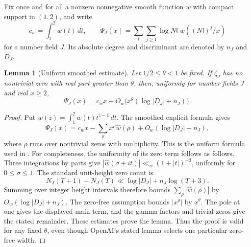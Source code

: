\documentclass[11pt]{article}
\newtheorem{lemma}[theorem]{Lemma}
\theoremstyle{definition}
\theoremstyle{remark}
\begin{document}
Fix once and for all a nonzero nonnegative smooth function $w$
with compact support in $(1,2)$, and write
\[
 c_w=\int_1^2 w(t)\,dt,\qquad
 \Psi_J(x)=\sum_{\mathfrak l}\sum_{j\geq1}
       \log N\mathfrak l\;w((N\mathfrak l)^j/x)
\]
for a number field $J$.  Its absolute degree and discriminant
are denoted by $n_J$ and $D_J$.

\begin{lemma}[Uniform smoothed estimate]\label{lem:smooth}
Let $1/2\leq\theta<1$ be fixed.  If $\zeta_J$ has no
nontrivial zero with real part greater than $\theta$, then,
uniformly for number fields $J$ and real $x\geq2$,
\[
 \Psi_J(x)=c_wx+
 O_w\bigl(x^\theta(\log|D_J|+n_J)\bigr).
\]
\end{lemma}
\begin{proof}
Put $\widehat w(z)=\int_1^2w(t)t^{z-1}\,dt$.
The smoothed explicit formula gives
\[
 \Psi_J(x)=c_wx-\sum_\rho x^\rho\widehat w(\rho)
          +O_w(\log|D_J|+n_J),
\]
where $\rho$ runs over nontrivial zeros with multiplicity.
This is the uniform formula used in
\citet[Lemma~11.2, p.~45]{OpenAI2026}.
For completeness, the uniformity of its zero term follows as follows.
Three integrations by parts give
$|\widehat w(\sigma+it)|\ll_w(1+|t|)^{-3}$,
uniformly for $0\leq\sigma\leq1$.
The standard unit-height zero count is
\[
 N_J(T+1)-N_J(T)\ll\log|D_J|+n_J\log(T+3).
\]
Summing over integer height intervals therefore bounds
$\sum_\rho|\widehat w(\rho)|$ by
$O_w(\log|D_J|+n_J)$.  The zero-free assumption bounds
$|x^\rho|$ by $x^\theta$.
The pole at one gives the displayed main term, and the gamma
factors and trivial zeros give the stated remainder.
These estimates prove the lemma.  Thus the proof is valid
for any fixed $\theta$, even though OpenAI's stated lemma
selects one particular zero-free width.
\end{proof}
\end{document}
